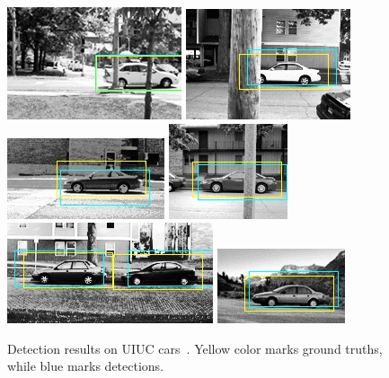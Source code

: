 \begin{figure}
\includegraphics[scale=0.75]{test-24_good.jpg}
\includegraphics[scale=0.75]{test-29_good.jpg}
\includegraphics[scale=0.75]{test-2_good.jpg}
\includegraphics[scale=0.75]{test-31_good.jpg}
\includegraphics[scale=0.75]{test-3_good.jpg}
\includegraphics[scale=0.75]{test-5_good.jpg}


\caption[Detection results on UIUC cars]{Detection results on UIUC cars~\citep{cds}. Yellow color marks ground truths, while blue marks detections.}
\label{fig:c5r}
\end{figure}

